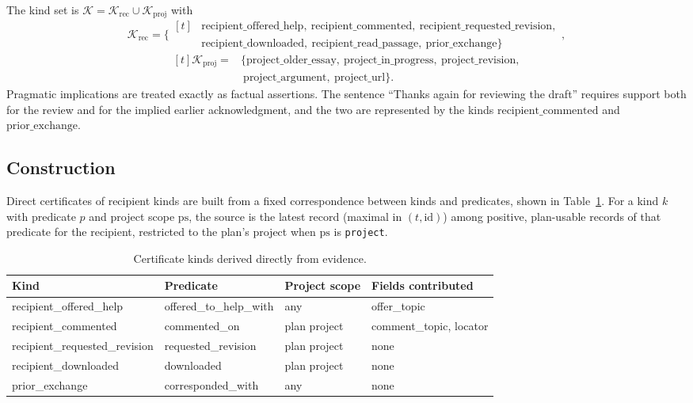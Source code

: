 \documentclass[11pt]{article}
\theoremstyle{definition}
\theoremstyle{remark}
\newcommand{\code}[1]{\texttt{#1}}
\begin{document}
The kind set is $\mathcal{K}=\mathcal{K}_{\mathrm{rec}}\cup\mathcal{K}_{\mathrm{proj}}$ with
\[
\mathcal{K}_{\mathrm{rec}}=\{\begin{aligned}[t]&\text{recipient\_offered\_help},\ \text{recipient\_commented},\ \text{recipient\_requested\_revision},\\&\text{recipient\_downloaded},\ \text{recipient\_read\_passage},\ \text{prior\_exchange}\}\end{aligned},
\]
\[
\begin{aligned}[t]\mathcal{K}_{\mathrm{proj}}={}&\{\text{project\_older\_essay},\ \text{project\_in\_progress},\ \text{project\_revision},\\&\ \text{project\_argument},\ \text{project\_url}\}.\end{aligned}
\]
Pragmatic implications are treated exactly as factual assertions. The sentence ``Thanks again for reviewing the draft'' requires support both for the review and for the implied earlier acknowledgment, and the two are represented by the kinds $\text{recipient\_commented}$ and $\text{prior\_exchange}$.

\subsection{Construction}

Direct certificates of recipient kinds are built from a fixed correspondence between kinds and predicates, shown in Table~\ref{tab:kindpred}. For a kind $k$ with predicate $p$ and project scope $\mathrm{ps}$, the source is the latest record (maximal in $(t,\mathrm{id})$) among positive, plan-usable records of that predicate for the recipient, restricted to the plan's project when $\mathrm{ps}$ is \code{project}.

\begin{table}[H]
\centering
\caption{Certificate kinds derived directly from evidence.}\label{tab:kindpred}
\begin{tabular}{llll}
\toprule
Kind & Predicate & Project scope & Fields contributed\\
\midrule
recipient\_offered\_help & offered\_to\_help\_with & any & offer\_topic\\
recipient\_commented & commented\_on & plan project & comment\_topic, locator\\
recipient\_requested\_revision & requested\_revision & plan project & none\\
recipient\_downloaded & downloaded & plan project & none\\
prior\_exchange & corresponded\_with & any & none\\
\bottomrule
\end{tabular}
\end{table}
\end{document}
